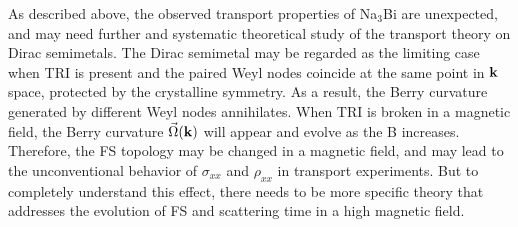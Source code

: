 As described above, the observed transport properties of Na$_3$Bi are unexpected, and may need further and systematic theoretical study of the transport theory on Dirac semimetals. The Dirac semimetal may be regarded as the limiting case when TRI is present and the paired Weyl nodes coincide at the same point in $\bf k$ space, protected by the crystalline symmetry. As a result, the Berry curvature generated by different Weyl nodes annihilates. When TRI is broken in a magnetic field, the Berry curvature $\vec{\Omega}(\bf k)$ will appear and evolve as the B increases. Therefore, the FS topology may be changed in a magnetic field, and may lead to the unconventional behavior of  $\sigma_{xx}$ and $\rho_{xx}$ in transport experiments. But to completely understand this effect, there needs to be more specific theory that addresses the evolution of FS and scattering time in a high magnetic field.








%

















\hfill \break


